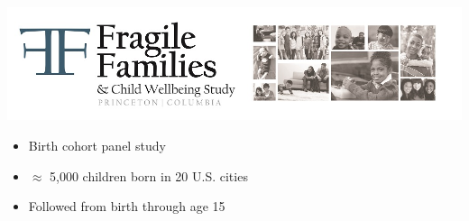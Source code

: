 \documentclass{beamer}
\begin{document}
\begin{frame}

\begin{center}
\includegraphics[width=\textwidth]{figures/ff_logo}
\end{center}

\begin{itemize}
\item Birth cohort panel study
\item $\approx$ 5,000 children born in 20 U.S. cities
\item Followed from birth through age 15
\end{itemize}

\end{frame}
\end{document}
